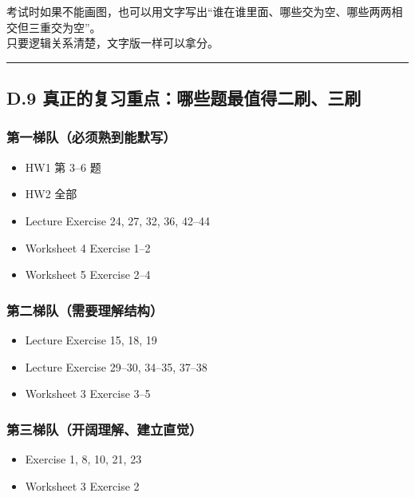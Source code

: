 \documentclass[
  11pt,
]{article}
\providecommand{\tightlist}{%
  \setlength{\itemsep}{0pt}\setlength{\parskip}{0pt}}
\begin{document}
考试时如果不能画图，也可以用文字写出``谁在谁里面、哪些交为空、哪些两两相交但三重交为空''。\\
只要逻辑关系清楚，文字版一样可以拿分。

\begin{center}\rule{0.5\linewidth}{0.5pt}\end{center}

\subsection{D.9
真正的复习重点：哪些题最值得二刷、三刷}\label{d.9-ux771fux6b63ux7684ux590dux4e60ux91cdux70b9ux54eaux4e9bux9898ux6700ux503cux5f97ux4e8cux5237ux4e09ux5237}

\subsubsection{第一梯队（必须熟到能默写）}\label{ux7b2cux4e00ux68afux961fux5fc5ux987bux719fux5230ux80fdux9ed8ux5199}

\begin{itemize}
\tightlist
\item
  HW1 第 3--6 题
\item
  HW2 全部
\item
  Lecture Exercise 24, 27, 32, 36, 42--44
\item
  Worksheet 4 Exercise 1--2
\item
  Worksheet 5 Exercise 2--4
\end{itemize}

\subsubsection{第二梯队（需要理解结构）}\label{ux7b2cux4e8cux68afux961fux9700ux8981ux7406ux89e3ux7ed3ux6784}

\begin{itemize}
\tightlist
\item
  Lecture Exercise 15, 18, 19
\item
  Lecture Exercise 29--30, 34--35, 37--38
\item
  Worksheet 3 Exercise 3--5
\end{itemize}

\subsubsection{第三梯队（开阔理解、建立直觉）}\label{ux7b2cux4e09ux68afux961fux5f00ux9614ux7406ux89e3ux5efaux7acbux76f4ux89c9}

\begin{itemize}
\tightlist
\item
  Exercise 1, 8, 10, 21, 23
\item
  Worksheet 3 Exercise 2
\end{itemize}
\end{document}
